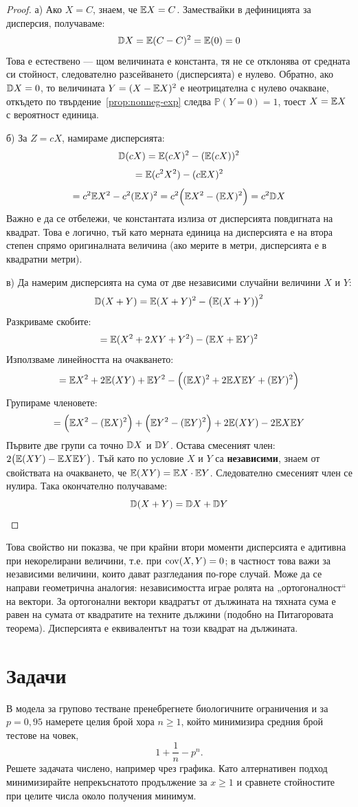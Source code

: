 \begin{proof}
а) Ако $X = C$, знаем, че $\mathbb{E} X = C$. Замествайки в дефиницията за дисперсия, получаваме:
\[ \mathbb{D} X = \mathbb{E}(C - C)^2 = \mathbb{E}(0) = 0 \]
Това е естествено — щом величината е константа, тя не се отклонява от средната си стойност, следователно разсейването (дисперсията) е нулево.
Обратно, ако $\mathbb{D} X = 0$, то величината $Y = (X - \mathbb{E} X)^2$ е неотрицателна с нулево
очакване, откъдето по твърдение~\ref{prop:nonneg-exp} следва $\mathbb{P}(Y = 0) = 1$, тоест
$X = \mathbb{E} X$ с вероятност единица.

б) За $Z = cX$, намираме дисперсията:
\[ \mathbb{D}(cX) = \mathbb{E}(cX)^2 - (\mathbb{E}(cX))^2 \]
\[ = \mathbb{E}(c^2 X^2) - (c\mathbb{E} X)^2 \]
\[ = c^2 \mathbb{E} X^2 - c^2 (\mathbb{E} X)^2 = c^2 \Big( \mathbb{E} X^2 - (\mathbb{E} X)^2 \Big) = c^2 \mathbb{D} X \]
Важно е да се отбележи, че константата излиза от дисперсията повдигната на квадрат. Това е логично, тъй като мерната единица на дисперсията е на втора степен спрямо оригиналната величина (ако мерите в метри, дисперсията е в квадратни метри).

в) Да намерим дисперсията на сума от две независими случайни величини $X$ и $Y$:
\[ \mathbb{D}(X + Y) = \mathbb{E}(X + Y)^2 - \big(\mathbb{E}(X + Y)\big)^2 \]
Разкриваме скобите:
\[ = \mathbb{E}(X^2 + 2XY + Y^2) - (\mathbb{E} X + \mathbb{E} Y)^2 \]
Използваме линейността на очакването:
\[ = \mathbb{E} X^2 + 2\mathbb{E}(XY) + \mathbb{E} Y^2 - \Big( (\mathbb{E} X)^2 + 2\mathbb{E} X\mathbb{E} Y + (\mathbb{E} Y)^2 \Big) \]
Групираме членовете:
\[ = \Big( \mathbb{E} X^2 - (\mathbb{E} X)^2 \Big) + \Big( \mathbb{E} Y^2 - (\mathbb{E} Y)^2 \Big) + 2\mathbb{E}(XY) - 2\mathbb{E} X\mathbb{E} Y \]
Първите две групи са точно $\mathbb{D} X$ и $\mathbb{D} Y$. Остава смесеният член: $2\big(\mathbb{E}(XY) - \mathbb{E} X\mathbb{E} Y\big)$.
Тъй като по условие $X$ и $Y$ са \textbf{независими}, знаем от свойствата на очакването, че $\mathbb{E}(XY) = \mathbb{E} X \cdot \mathbb{E} Y$. Следователно смесеният член се нулира. Така окончателно получаваме:
\[ \mathbb{D}(X + Y) = \mathbb{D} X + \mathbb{D} Y \]
\end{proof}

Това свойство ни показва, че при крайни втори моменти дисперсията е адитивна при
некорелирани величини, т.е. при $\operatorname{cov}(X,Y)=0$; в частност това важи за независими
величини, които дават разгледания по-горе случай. Може да се направи геометрична
аналогия: независимостта играе ролята на „ортогоналност“ на вектори. За ортогонални вектори квадратът от дължината на тяхната
сума е равен на сумата от квадратите на техните дължини (подобно на Питагоровата
теорема). Дисперсията е еквивалентът на този квадрат на дължината.

\section{Задачи}

В модела за групово тестване пренебрегнете биологичните ограничения и за $p=0{,}95$ намерете целия брой хора $n\geq 1$, който минимизира средния брой тестове на човек,
\[
1+\frac{1}{n}-p^n.
\]
Решете задачата числено, например чрез графика. Като алтернативен подход минимизирайте непрекъснатото продължение за $x\geq 1$ и сравнете стойностите при целите числа около получения минимум.
